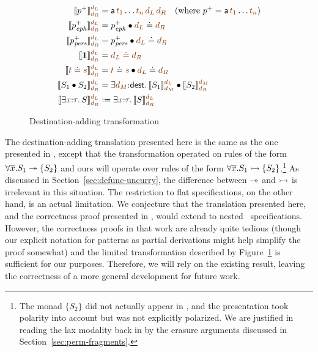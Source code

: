\begin{figure}
\begin{align*}
\llbracket p^+ \rrbracket^{\lf{d_L}}_{\lf{d_R}} & = 
 {\sf a}\,\lf{t_1}\ldots \lf{t_n}\,\lf{d_L}\,\lf{d_R} ~~~ \mbox{(where $p^+ = {\sf a}\,\lf{t_1}\ldots \lf{t_n}$)}
\\
\llbracket p^+_\meph \rrbracket^{\lf{d_L}}_{\lf{d_R}} & = p^+_\meph \fuse \lf{d_L} \doteq \lf{d_R}
\\
\llbracket p^+_\mpers \rrbracket^{\lf{d_L}}_{\lf{d_R}} & = p^+_\mpers \fuse \lf{d_L} \doteq \lf{d_R}
\\
\llbracket \one \rrbracket^{\lf{d_L}}_{\lf{d_R}} & = \lf{d_L \doteq d_R}
\\
\llbracket \lf t \doteq \lf s \rrbracket^{\lf{d_L}}_{\lf{d_R}} & = \lf{t} \doteq \lf{s} \fuse \lf{d_L} \doteq \lf{d_R}
\\
\llbracket S_1 \fuse S_2 \rrbracket^{\lf{d_L}}_{\lf{d_R}} & = 
 \exists \lf{d_M}{:}{\sf dest}.\, 
   \llbracket S_1 \rrbracket^{\lf{d_L}}_{\lf{d_M}}
   \fuse
   \llbracket S_2 \rrbracket^{\lf{d_M}}_{\lf{d_R}}
\\
\llbracket \exists \lf{x}{:}\tau.\,S \rrbracket^{\lf{d_L}}_{\lf{d_R}} & := 
 \exists \lf{x}{:}\tau.\, \llbracket S \rrbracket^{\lf{d_L}}_{\lf{d_R}}
\end{align*}
\caption{Destination-adding transformation}
\label{fig:destadd-pos}
\end{figure}


The destination-adding translation presented here is the same as the
one presented in \cite{simmons11logical}, except that the
transformation operated on rules of the form $\forall
\overline{x}. S_1 \twoheadrightarrow \{ S_2 \}$ and ours will operate over rules
of the form $\forall \overline{x}. S_1 \rightarrowtail \{ S_2 \}$.\footnote{The
  monad $\{ S_2 \}$ did not actually appear in
  \cite{simmons11logical}, and the presentation took polarity into
  account but was not explicitly polarized. We are justified in
  reading the lax modality back in by the erasure arguments discussed
  in Section~\ref{sec:perm-fragments}.} As discussed in
Section~\ref{sec:defunc-uncurry}, the difference between $\twoheadrightarrow$ and
$\rightarrowtail$ is irrelevant in this situation. The restriction to flat
specifications, on the other hand, is an actual limitation. We
conjecture that the translation presented here, and the correctness
proof presented in \cite{simmons11logical}, would extend to nested
\sls~specifications. However, the correctness proofs in that work are
already quite tedious (though our explicit notation for patterns as
partial derivations might help simplify the proof somewhat) and the
limited transformation described by Figure~\ref{fig:destadd-pos}
 is sufficient for our purposes. Therefore, we
will rely on the existing result, leaving the correctness of a more
general development for future work.

